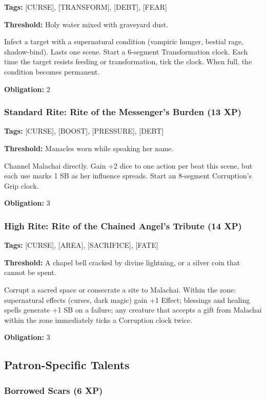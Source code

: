 \textbf{Tags:} [CURSE], [TRANSFORM], [DEBT], [FEAR]

\textbf{Threshold:} Holy water mixed with graveyard dust.

Infect a target with a supernatural condition (vampiric hunger, bestial rage, shadow-bind). Lasts one scene. Start a 6-segment Transformation clock. Each time the target resists feeding or transformation, tick the clock. When full, the condition becomes permanent.

\textbf{Obligation:} 2

\subsubsection{Standard Rite: Rite of the Messenger's Burden (13 XP)}

\textbf{Tags:} [CURSE], [BOOST], [PRESSURE], [DEBT]

\textbf{Threshold:} Manacles worn while speaking her name.

Channel Malachai directly. Gain +2 dice to one action per beat this scene, but each use marks 1 SB as her influence spreads. Start an 8-segment Corruption's Grip clock.

\textbf{Obligation:} 3

\subsubsection{High Rite: Rite of the Chained Angel's Tribute (14 XP)}

\textbf{Tags:} [CURSE], [AREA], [SACRIFICE], [FATE]

\textbf{Threshold:} A chapel bell cracked by divine lightning, or a silver coin that cannot be spent.

Corrupt a sacred space or consecrate a site to Malachai. Within the zone: supernatural effects (curses, dark magic) gain +1 Effect; blessings and healing spells generate +1 SB on a failure; any creature that accepts a gift from Malachai within the zone immediately ticks a Corruption clock twice.

\textbf{Obligation:} 3

\subsection{Patron-Specific Talents}

\subsubsection{Borrowed Scars (6 XP)}

